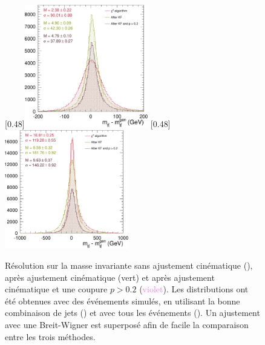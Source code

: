 \bigskip

\begin{figure}[tbp] \centering
    \subcaptionbox{\label{fig:kinfit_matched_events}}[0.48\textwidth]{\includegraphics[width=0.48\textwidth]{chapitre6/figs/kinfit/mtt_resolution_comparison_kf_good_solutions.pdf}} \hfill
    \subcaptionbox{\label{fig:kinfit_all_events}}[0.48\textwidth]{\includegraphics[width=0.48\textwidth]{chapitre6/figs/kinfit/mtt_resolution_comparison_kf_all_events.pdf}}
    \caption{Résolution sur la masse invariante \mtt sans ajustement cinématique (\rouge), après ajustement cinématique (\textcolor{vert}{vert}) et après ajustement cinématique et une coupure $p > \num{0.2}$ (\textcolor{violet}{violet}). Les distributions ont été obtenues avec des événements \ttbar simulés, en utilisant la bonne combinaison de jets () et avec tous les événements (). Un ajustement avec une Breit-Wigner est superposé afin de facile la comparaison entre les trois méthodes.}
    \label{fig:kinfit_ttbar}
\end{figure}

